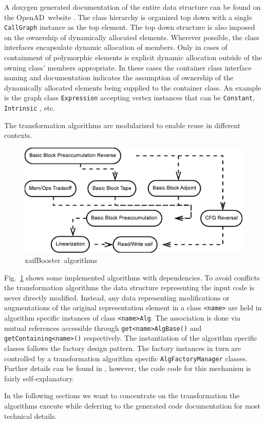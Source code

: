 \documentclass{book}
\newcommand{\OpenAD}{OpenAD}
\newcommand{\xaifBooster}{xaifBooster}
\newcommand{\reffig}[1]{{Fig.~\ref{#1}}}
\begin{document}
A doxygen generated documentation of the entire data structure 
can be found on the \OpenAD\ website \cite{openadWeb}.
The class hierarchy is organized top down with 
a single \lstinline{CallGraph} instance as the top element. 
The top down structure is also imposed on the ownership of dynamically 
allocated elements. 
Wherever possible, the class interfaces encapsulate dynamic 
allocation of members.  
Only in cases of containment of polymorphic elements is explicit dynamic allocation 
outside of the owning class' members appropriate. 
In these cases the container class interface naming and documentation 
indicates the assumption of ownership of 
the dynamically allocated elements being supplied to the container class. 
An example is the graph class \lstinline{Expression} accepting vertex instances that can be 
\lstinline{Constant}, \lstinline{Intrinsic} , etc.

The transformation algorithms are modularized to enable reuse in different 
contexts. 
\begin{figure}
  \centering \includegraphics[width=.45\textwidth]{allAlgs}
  \caption{\xaifBooster\ algorithms} \label{fig:allAlgs}
\end{figure}
\reffig{fig:allAlgs} shows some implemented algorithms with dependencies.
To avoid conflicts the transformation algorithms the data structure representing the input code  
is never directly modified. 
Instead, any data representing modifications or augmentations of the 
original representation element in a class \lstinline{<name>}
are held in algorithm specific instances of class \lstinline{<name>Alg}.
The association is done via mutual references accessible 
through \lstinline{get<name>AlgBase()} and \lstinline{getContaining<name>()} respectively.
The instantiation of the algorithm specific classes follows 
the factory design pattern. The factory instances in turn are controlled 
by a transformation algorithm specific \lstinline{AlgFactoryManager} classes. 
Further details can be found in \cite{Utke2003STI}, however, the code 
code for this mechanism is fairly self-explanatory.  

In the following sections we want to concentrate on the transformation 
the algorithms execute while deferring to the generated code 
documentation for most technical details.
\end{document}
